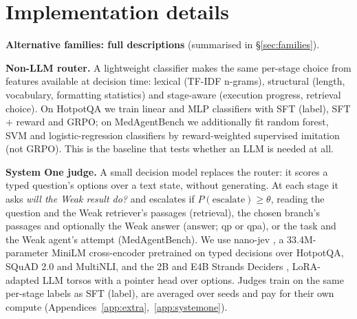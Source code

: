 \documentclass{article}
\begin{document}
\section{Implementation details}
\label{app:impl}
\label{app:families}\textbf{Alternative families: full descriptions} (summarised in \S\ref{sec:families}).

\textbf{Non-LLM router.} A lightweight classifier makes the same per-stage choice from features available at decision time: lexical (TF-IDF n-grams), structural (length, vocabulary, formatting statistics) and stage-aware (execution progress, retrieval choice). On HotpotQA we train linear and MLP classifiers with SFT (label), SFT + reward and GRPO; on MedAgentBench we additionally fit random forest, SVM and logistic-regression classifiers by reward-weighted supervised imitation (not GRPO). This is the baseline that tests whether an LLM is needed at all.

\textbf{System One judge.} A small decision model replaces the router: it scores a typed question's options over a text state, without generating. At each stage it asks \emph{will the Weak result do?} and escalates if $P(\text{escalate})\ge\theta$, reading the question and the Weak retriever's passages (retrieval), the chosen branch's passages and optionally the Weak answer (answer; qp or qpa), or the task and the Weak agent's attempt (MedAgentBench). We use nano-jev \citep{nanojev2026}, a 33.4M-parameter MiniLM cross-encoder \citep{wang2020minilm} pretrained on typed decisions over HotpotQA, SQuAD 2.0 and MultiNLI, and the 2B and E4B Strands Deciders \citep{strandsdecider2026}, LoRA-adapted LLM torsos with a pointer head over options. Judges train on the same per-stage labels as SFT (label), are averaged over seeds and pay for their own compute (Appendices~\ref{app:extra},~\ref{app:systemone}).
\end{document}
